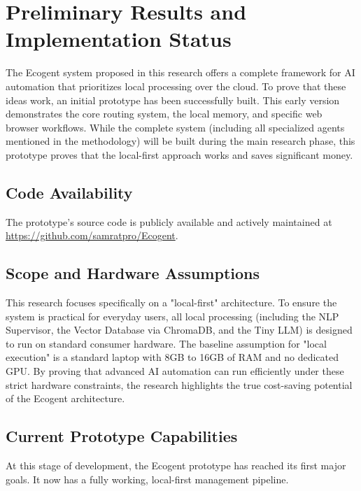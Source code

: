 \section{Preliminary Results and Implementation Status}
The Ecogent system proposed in this research offers a complete framework for AI automation that prioritizes local processing over the cloud. To prove that these ideas work, an initial prototype has been successfully built. This early version demonstrates the core routing system, the local memory, and specific web browser workflows. While the complete system (including all specialized agents mentioned in the methodology) will be built during the main research phase, this prototype proves that the local-first approach works and saves significant money.\\

\subsection*{Code Availability}
The prototype's source code is publicly available and actively maintained at\\ 
\url{https://github.com/samratpro/Ecogent}.

\subsection*{Scope and Hardware Assumptions}
This research focuses specifically on a "local-first" architecture. To ensure the system is practical for everyday users, all local processing (including the NLP Supervisor, the Vector Database via ChromaDB, and the Tiny LLM) is designed to run on standard consumer hardware. The baseline assumption for "local execution" is a standard laptop with 8GB to 16GB of RAM and no dedicated GPU. By proving that advanced AI automation can run efficiently under these strict hardware constraints, the research highlights the true cost-saving potential of the Ecogent architecture.\\

\subsection*{Current Prototype Capabilities}
At this stage of development, the Ecogent prototype has reached its first major goals. It now has a fully working, local-first management pipeline.\\

